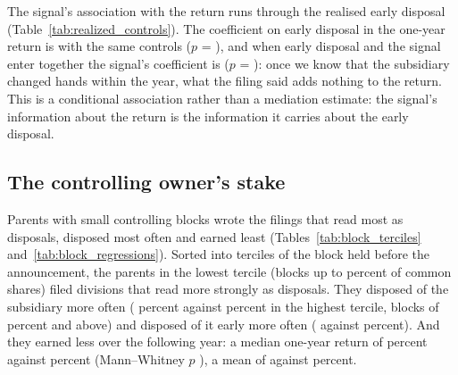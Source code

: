 The signal's association with the return runs through the realised early disposal (Table~\ref{tab:realized_controls}). The coefficient on early disposal in the one-year return is \JointEarlyCoef{} with the same controls ($p$ = \JointEarlyP), and when early disposal and the signal enter together the signal's coefficient is \JointScoreCoef{} ($p$ = \JointScoreP): once we know that the subsidiary changed hands within the year, what the filing said adds nothing to the return. This is a conditional association rather than a mediation estimate: the signal's information about the return is the information it carries about the early disposal.

\begin{table}[htbp]
\centering
\caption{Returns on realized early disposal}\label{tab:realized_controls}
{\footnotesize\setlength{\tabcolsep}{3pt}}
\end{table}

\subsection{The controlling owner's stake}\label{sec:block}

Parents with small controlling blocks wrote the filings that read most as disposals, disposed most often and earned least (Tables~\ref{tab:block_terciles} and~\ref{tab:block_regressions}). Sorted into terciles of the block held before the announcement, the parents in the lowest tercile (blocks up to \LowBlockMax{} percent of common shares) filed divisions that read more strongly as disposals. They disposed of the subsidiary more often (\LowBlockDisp{} percent against \HighBlockDisp{} percent in the highest tercile, blocks of \HighBlockMin{} percent and above) and disposed of it early more often (\LowBlockEarly{} against \HighBlockEarly{} percent). And they earned less over the following year: a median one-year return of \LowBlockMedian{} percent against \HighBlockMedian{} percent (Mann--Whitney $p$ \LowHighMWP), a mean of \LowBlockMean{} against \HighBlockMean{} percent.


